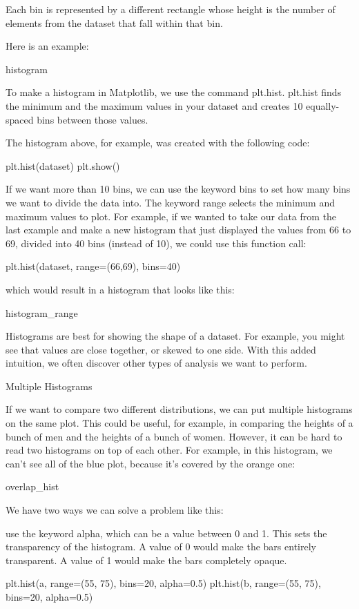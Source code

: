 \documentclass{journal}
\begin{document}
Each bin is represented by a different rectangle whose height is the number of elements from the dataset that fall within that bin.

Here is an example:

histogram

To make a histogram in Matplotlib, we use the command plt.hist. plt.hist finds the minimum and the maximum values in your dataset and creates 10 equally-spaced bins between those values.

The histogram above, for example, was created with the following code:

plt.hist(dataset) 
plt.show()

If we want more than 10 bins, we can use the keyword bins to set how many bins we want to divide the data into. The keyword range selects the minimum and maximum values to plot. For example, if we wanted to take our data from the last example and make a new histogram that just displayed the values from 66 to 69, divided into 40 bins (instead of 10), we could use this function call:

plt.hist(dataset, range=(66,69), bins=40)

which would result in a histogram that looks like this:

histogram_range

Histograms are best for showing the shape of a dataset. For example, you might see that values are close together, or skewed to one side. With this added intuition, we often discover other types of analysis we want to perform.




Multiple Histograms

If we want to compare two different distributions, we can put multiple histograms on the same plot. This could be useful, for example, in comparing the heights of a bunch of men and the heights of a bunch of women. However, it can be hard to read two histograms on top of each other. For example, in this histogram, we can’t see all of the blue plot, because it’s covered by the orange one:

overlap_hist

We have two ways we can solve a problem like this:

    use the keyword alpha, which can be a value between 0 and 1. This sets the transparency of the histogram. A value of 0 would make the bars entirely transparent. A value of 1 would make the bars completely opaque.

    plt.hist(a, range=(55, 75), bins=20, alpha=0.5)
    plt.hist(b, range=(55, 75), bins=20, alpha=0.5)
\end{document}
